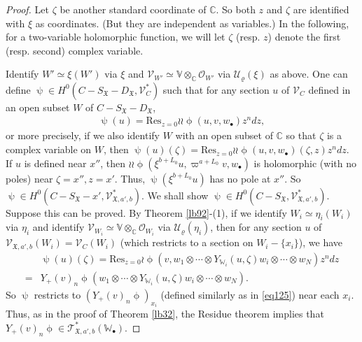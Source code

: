 \documentclass[12pt,b5paper,notitlepage]{report}
\theoremstyle{definition}
\theoremstyle{plain}
\newcommand{\fk}{\mathfrak}
\newcommand{\mc}{\mathcal}
\newcommand{\Res}{\mathrm{Res}}
\newcommand{\scr}{\mathscr}
\newcommand{\SX}{S_{\fk X}}
\newcommand{\DX}{D_{\fk X}}
\newcommand{\blt}{\bullet}
\newcommand{\Vbb}{\mathbb V}
\newcommand{\Wbb}{\mathbb W}
\newcommand{\Cbb}{\mathbb C}
\numberwithin{equation}{section}
\begin{document}
\begin{proof}
Let $\zeta$ be another standard coordinate of $\Cbb$. So both $z$ and $\zeta$ are identified with $\xi$ as coordinates. (But they are independent as variables.) In the following, for a two-variable holomorphic function, we will let $\zeta$ (resp. $z$) denote the first (resp. second) complex variable.

Identify $W'\simeq\xi(W')$ via $\xi$ and  $\scr V_{W'}\simeq\Vbb\otimes_\Cbb\scr O_{W'}$ via $\mc U_\varrho(\xi)$ as above. One can define $\uppsi\in H^0(C-\SX-\DX,\scr V_C^*)$ such that for any section $u$ of $\scr V_C$ defined in an open subset $W$ of $C-\SX-\DX$,
\begin{align*}
\uppsi(u)=\Res_{z=0}\wr\wr\upphi(u, v,w_\blt)z^ndz,
\end{align*}
or more precisely, if we also identify $W$ with an open subset of $\Cbb$ so that $\zeta$ is a complex variable on $W$, then $\uppsi(u)(\zeta)=\Res_{z=0}\wr\wr\upphi(u, v,w_\blt)(\zeta,z)z^ndz$. If $u$ is defined near $x''$, then $\wr\wr\upphi(\xi^{b+L_0}u, \varpi^{a+L_0}v,w_\blt)$ is holomorphic (with no poles) near $\zeta=x'',z=x'$. Thus, $\uppsi(\xi^{b+L_0}u)$ has no  pole at $x''$. So $\uppsi\in H^0(C-\SX-x',\scr V_{\fk X,a',b}^*)$. We shall show $\uppsi\in H^0(C-\SX,\scr V_{\fk X,a',b}^*)$. Suppose this can be proved. By Theorem \ref{lb92}-(1), if we identify $W_i\simeq \eta_i(W_i)$ via $\eta_i$ and identify $\scr V_{W_i}\simeq\Vbb\otimes_\Cbb\scr O_{W_i}$ via $\mc U_\varrho(\eta_i)$, then for any section $u$ of $\scr V_{\fk X,a',b}(W_i)=\scr V_C(W_i)$  (which restricts to a section on $W_i-\{x_i\}$), we have
\begin{align*}
&\uppsi(u)(\zeta)=\Res_{z=0}\wr\upphi(v,w_1\otimes\cdots\otimes Y_{\Wbb_i}(u,\zeta)w_i\otimes\cdots\otimes w_N)z^ndz\\
=&Y_+(v)_n\upphi(w_1\otimes\cdots\otimes Y_{\Wbb_i}(u,\zeta)w_i\otimes\cdots\otimes w_N).
\end{align*}
So $\uppsi$ restricts to $(Y_+(v)_n\upphi)_{x_i}$ (defined similarly as in \eqref{eq125}) near each $x_i$. Thus, as in the proof of Theorem \ref{lb32}, the Residue theorem implies that $Y_+(v)_n\upphi\in \scr T_{\fk X,a',b}^*(\Wbb_\blt)$.


\end{proof}
\end{document}
